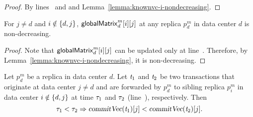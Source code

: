 \begin{proof} \label{proof:committedcausal-i}
  By lines~\code{\ref{alg:unistore-replication}}{\ref{line:replicate-committedcausal}}
  and \code{\ref{alg:unistore-replication}}{\ref{line:replicate-knownvc}}
  and Lemma~\ref{lemma:knownvc-i-nondecreasing}.
\end{proof}

\begin{applemma} \label{lemma:globalmatrix-nondecreasing}
  For $j \neq d$ and $i \notin \{d, j\}$,
  ${\sf globalMatrix}^{m}_{d}[i][j]$ at any replica $p^{m}_{d}$
  in data center $d$ is non-decreasing.
\end{applemma}

\begin{proof} \label{proof:globalmatrix-nondecreasing}
  Note that ${\sf globalMatrix}^{m}_{d}[i][j]$ can be updated only
  at line~\code{\ref{alg:unistore-clock}}{\ref{line:knownvcglobal-globalmatrix}}.
  Therefore, by Lemma~\ref{lemma:knownvc-i-nondecreasing},
  it is non-decreasing.
\end{proof}

\begin{applemma} \label{lemma:forwarding-order}
  Let $p^{m}_{d}$ be a replica in data center $d$.
  Let $\mathit{t}_{1}$ and $\mathit{t}_{2}$ be two transactions
  that originate at data center $j \neq d$
  and are forwarded by $p^{m}_{d}$ to
  sibling replica $p^{m}_{i}$ in data center $i \notin \{d, j\}$
  at time $\tau_{1}$ and $\tau_{2}$
  (line~\code{\ref{alg:unistore-replication}}{\ref{line:forward-call-replicate}}),
  respectively. Then
  \[
    \realtime_{1} < \realtime_{2} \implies \commitVC(\tvar_{1})[j] < \commitVC(\tvar_{2})[j].
  \]
\end{applemma}

